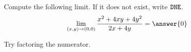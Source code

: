 \documentclass{ximera}
\author{Jim Talamo \and Bart Snapp}
\begin{document}
\begin{exercise}
  Compute the following limit. If it does not exist, write $\verb|DNE|$.
  \[
  \lim_{\point{x,y}\to \point{0,0}}\frac{x^2+4xy+4y^2}{2x+4y} = \answer{0}
  \]
  
  \begin{hint}
Try factoring the numerator. 
  \end{hint}
\end{exercise}
\end{document}
